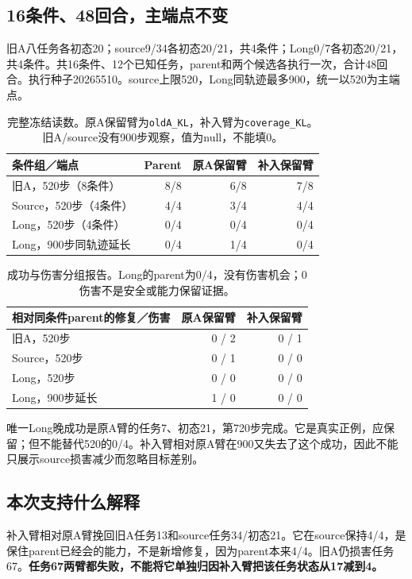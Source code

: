 \documentclass[UTF8,a4paper,fontset=none,zihao=-4]{ctexart}
\begin{document}
\subsection{16条件、48回合，主端点不变}
旧A八任务各初态20；source9/34各初态20/21，共4条件；Long0/7各初态20/21，共4条件。共16条件、12个已知任务，parent和两个候选各执行一次，合计48回合。执行种子20265510。source上限520，Long同轨迹最多900，统一以520为主端点。
\par
\begin{table}[htbp]\centering\small
\begin{tabularx}{\textwidth}{Yrrr}\toprule
条件组／端点 & Parent & 原A保留臂 & 补入保留臂\\\midrule
旧A，520步（8条件） &8/8&6/8&7/8\\
Source，520步（4条件） &4/4&3/4&4/4\\
Long，520步（4条件） &0/4&0/4&0/4\\
Long，900步同轨迹延长 &0/4&1/4&0/4\\\bottomrule
\end{tabularx}
\caption{完整冻结读数。原A保留臂为\texttt{oldA\_KL}，补入臂为\texttt{coverage\_KL}。旧A/source没有900步观察，值为null，不能填0。}
\end{table}
\par
\begin{table}[htbp]\centering\small
\begin{tabularx}{\textwidth}{Yrr}\toprule
相对同条件parent的修复／伤害 & 原A保留臂 & 补入保留臂\\\midrule
旧A，520步 &0 / 2&0 / 1\\
Source，520步 &0 / 1&0 / 0\\
Long，520步 &0 / 0&0 / 0\\
Long，900步延长 &1 / 0&0 / 0\\\bottomrule
\end{tabularx}
\caption{成功与伤害分组报告。Long的parent为0/4，没有伤害机会；0伤害不是安全或能力保留证据。}
\end{table}
\par
唯一Long晚成功是原A臂的任务7、初态21，第720步完成。它是真实正例，应保留；但不能替代520的0/4。补入臂相对原A臂在900又失去了这个成功，因此不能只展示source损害减少而忽略目标差别。
\subsection{本次支持什么解释}
补入臂相对原A臂挽回旧A任务13和source任务34/初态21。它在source保持4/4，是保住parent已经会的能力，不是新增修复，因为parent本来4/4。旧A仍损害任务67。\textbf{任务67两臂都失败，不能将它单独归因补入臂把该任务状态从17减到4。}
\end{document}
